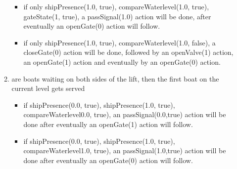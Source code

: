 \begin{enumerate}
\begin{enumerate}
\begin{itemize}
			\item if only shipPresence(1.0, true), compareWaterlevel(1.0, true), gateState(1, true), a passSignal(1.0) action will be done, after eventually an openGate(0) action will follow.
			\item if only shipPresence(1.0, true), compareWaterlevel(1.0, false), a closeGate(0) action will be done, followed by an openValve(1) action, an openGate(1) action and eventually by an openGate(0) action.
		\end{itemize} 
		\item are boats waiting on both sides of the lift, then the first boat on the current level gets served
		\begin{itemize}
			\item if shipPresence(0.0, true), shipPresence(1.0, true), compareWaterlevel0.0, true), an passSignal(0.0,true) action will be done after eventually an openGate(1) action will follow.
			\item if shipPresence(0.0, true), shipPresence(1.0, true), compareWaterlevel1.0, true), an passSignal(1.0,true) action will be done after eventually an openGate(0) action will follow.
		\end{itemize}
	\end{enumerate}
\end{enumerate}

